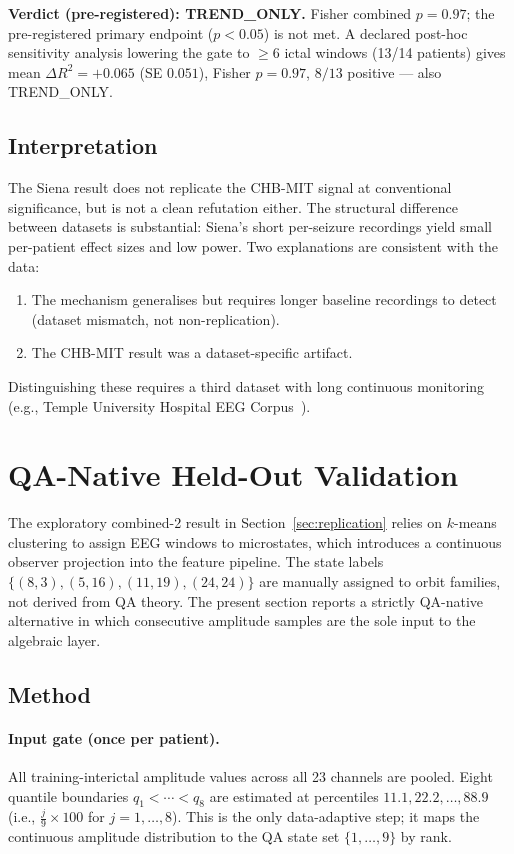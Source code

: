 \documentclass[11pt]{article}
\begin{document}
\noindent\textbf{Verdict (pre-registered): TREND\_ONLY.}
Fisher combined $p = 0.97$; the pre-registered primary endpoint ($p < 0.05$) is not met.
A declared post-hoc sensitivity analysis lowering the gate to $\geq 6$ ictal windows
(13/14 patients) gives mean $\Delta R^2 = +0.065$ (SE $0.051$),
Fisher $p = 0.97$, $8/13$ positive --- also TREND\_ONLY.

\subsection*{Interpretation}

The Siena result does not replicate the CHB-MIT signal at conventional significance,
but is not a clean refutation either.
The structural difference between datasets is substantial: Siena's short
per-seizure recordings yield small per-patient effect sizes and low power.
Two explanations are consistent with the data:
\begin{enumerate}[nosep]
  \item The mechanism generalises but requires longer baseline recordings to detect
        (dataset mismatch, not non-replication).
  \item The CHB-MIT result was a dataset-specific artifact.
\end{enumerate}
Distinguishing these requires a third dataset with long continuous monitoring
(e.g., Temple University Hospital EEG Corpus~\cite{tueg}).

\section{QA-Native Held-Out Validation}\label{sec:qa_native}

The exploratory combined-2 result in Section~\ref{sec:replication}
relies on $k$-means clustering to assign EEG windows to microstates,
which introduces a continuous observer projection into the feature
pipeline.  The state labels $\{(8,3),(5,16),(11,19),(24,24)\}$ are
manually assigned to orbit families, not derived from QA theory.
The present section reports a strictly QA-native alternative in which
consecutive amplitude samples are the sole input to the algebraic layer.

\subsection*{Method}

\paragraph{Input gate (once per patient).}
All training-interictal amplitude values across all 23 channels are
pooled.  Eight quantile boundaries $q_1 < \cdots < q_8$ are estimated
at percentiles $11.1, 22.2, \ldots, 88.9$ (i.e., $\frac{j}{9} \times 100$
for $j = 1,\ldots,8$).  This is the only data-adaptive step; it maps
the continuous amplitude distribution to the QA state set $\{1,\ldots,9\}$
by rank.
\end{document}
